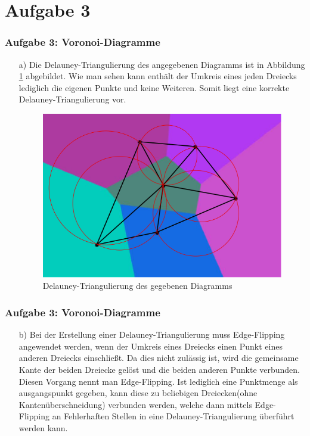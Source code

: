 \documentclass[accentcolor=tud9c,colorbacktitle,inverttitle,landscape,german,presentation,t]{tudbeamer}
\begin{document}
\section{Aufgabe 3}
\begin{frame}
	\frametitle{Aufgabe 3: Voronoi-Diagramme}
	\begin{itemize}
	\item[a)]
	Die Delauney-Triangulierung des angegebenen Diagramms ist in Abbildung \ref{DelTri} abgebildet. Wie man sehen kann enthält der Umkreis eines jeden Dreiecks lediglich die eigenen Punkte und keine Weiteren. Somit liegt eine korrekte Delauney-Triangulierung vor.
	\begin{figure}
		\includegraphics[width = .5\linewidth]{task_3a.png}
		\caption{Delauney-Triangulierung des gegebenen Diagramms}
		\label{DelTri}
	\end{figure}
	\end{itemize} 
\end{frame}
\begin{frame}
	\frametitle{Aufgabe 3: Voronoi-Diagramme}
	\begin{itemize}
	\item[b)]
	Bei der Erstellung einer Delauney-Triangulierung muss Edge-Flipping angewendet werden, wenn der Umkreis eines Dreiecks einen Punkt eines anderen Dreiecks einschließt. Da dies nicht zulässig ist, wird die gemeinsame Kante der beiden Dreiecke gelöst und die beiden anderen Punkte verbunden. Diesen Vorgang nennt man Edge-Flipping. Ist lediglich eine Punktmenge als ausgangspunkt gegeben, kann diese zu beliebigen Dreiecken(ohne Kantenüberschneidung)  verbunden werden, welche dann mittels Edge-Flipping an Fehlerhaften Stellen in eine Delauney-Triangulierung überführt werden kann. 
	\end{itemize} 
\end{frame}
\end{document}
